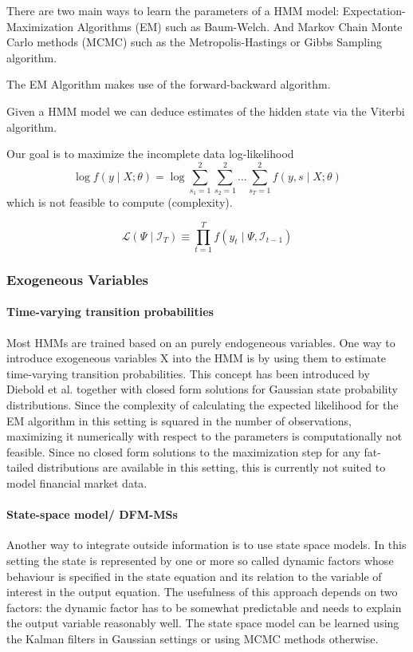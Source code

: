 \documentclass[11pt,a4paper]{article}
\begin{document}
There are two main ways to learn the parameters of a HMM model: Expectation-Maximization Algorithms (EM) such as Baum-Welch. And Markov Chain Monte Carlo methods (MCMC) such as the Metropolis-Hastings or Gibbs Sampling algorithm.

The EM Algorithm makes use of the forward-backward algorithm.

Given a HMM model we can deduce estimates of the hidden state via the Viterbi algorithm.

Our goal is to maximize the incomplete data log-likelihood 
$$\log f(y \mid X ; \theta)=\log \sum_{s_{1}=1}^{2} \sum_{s_{2}=1}^{2} \ldots \sum_{s_{T}=1}^{2} f(y, s \mid X ; \theta)$$ which is not feasible to compute (complexity).


$$ \mathcal{L}\left(\Psi \mid \mathcal{I}_T\right) \equiv \prod_{t=1}^T f\left(y_t \mid \Psi, \mathcal{I}_{t-1}\right) $$ 

\subsubsection{Exogeneous Variables}
\paragraph{Time-varying transition probabilities}
Most HMMs are trained based on an purely endogeneous variables. One way to introduce exogeneous variables X into the HMM is by using them to estimate time-varying transition probabilities. This concept has been introduced by Diebold et al. \cite{diebold_regime_1993} together with closed form solutions for Gaussian state probability distributions. Since the complexity of calculating the expected likelihood for the EM algorithm in this setting is squared in the number of observations, maximizing it numerically with respect to the parameters is computationally not feasible. Since no closed form solutions to the maximization step for any fat-tailed distributions are available in this setting, this is currently not suited to model financial market data.

\paragraph{State-space model/ DFM-MSs}
Another way to integrate outside information is to use state space models. In this setting the state is represented by one or more so called dynamic factors whose behaviour is specified in the state equation and its relation to the variable of interest in the output equation. The usefulness of this approach depends on two factors: the dynamic factor has to be somewhat predictable and 
needs to explain the output variable reasonably well. The state space model can be learned using the Kalman filters in Gaussian settings or using MCMC methods otherwise.
\end{document}
